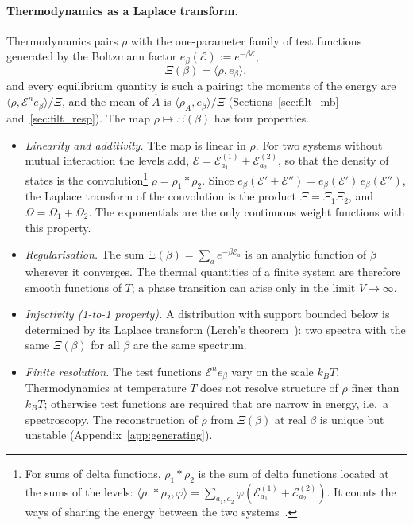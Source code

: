 \documentclass[10pt,a4paper]{article}
\theoremstyle{plain}
\newcommand{\enrg}{\mathcal{E}}  %
\begin{document}
\paragraph{Thermodynamics as a Laplace transform.} Thermodynamics pairs
$\rho$ with the one-parameter family of test functions generated by the
Boltzmann factor $e_\beta(\enrg):=e^{-\beta\enrg}$,
\begin{equation}\label{eq:filt_map}
  \Xi(\beta)=\langle \rho,e_\beta\rangle ,
\end{equation}
and every equilibrium quantity is such a pairing: the moments of the energy
are $\langle\rho,\enrg^{n}e_\beta\rangle/\Xi$, and the mean of $\hat A$ is
$\langle\rho_A,e_\beta\rangle/\Xi$
(Sections~\ref{sec:filt_mb} and~\ref{sec:filt_resp}). The map
$\rho\mapsto\Xi(\beta)$ has four properties.
\begin{itemize}\setlength{\itemsep}{2pt}
\item \emph{Linearity and additivity.} The map is linear in $\rho$. For two
  systems without mutual interaction the levels add,
  $\enrg=\enrg^{(1)}_{a_1}+\enrg^{(2)}_{a_2}$, so that the density of states is
  the convolution\footnote{For sums of delta functions, $\rho_1*\rho_2$ is the
  sum of delta functions located at the sums of the levels:
  $\langle\rho_1*\rho_2,\varphi\rangle=\sum_{a_1,a_2}\varphi(\enrg^{(1)}_{a_1}+\enrg^{(2)}_{a_2})$.
  It counts the ways of sharing the energy between the two
  systems~\cite{Zemanian}.} $\rho=\rho_1*\rho_2$. Since
  $e_\beta(\enrg'+\enrg'')=e_\beta(\enrg')\,e_\beta(\enrg'')$, the Laplace
  transform of the convolution is the product $\Xi=\Xi_1\Xi_2$, and
  $\Omega=\Omega_1+\Omega_2$. The exponentials are the only continuous weight
  functions with this property.
\item \emph{Regularisation.} The sum $\Xi(\beta)=\sum_ae^{-\beta\enrg_a}$ is an
  analytic function of $\beta$ wherever it converges. The thermal quantities
  of a finite system are therefore smooth functions of $T$; a phase
  transition can arise only in the limit $V\to\infty$.
\item \emph{Injectivity (1-to-1 property).} A distribution with support bounded below is
  determined by its Laplace transform (Lerch's theorem~\cite{Widder}): two
  spectra with the same $\Xi(\beta)$ for all $\beta$ are the same spectrum.
\item \emph{Finite resolution.} The test functions $\enrg^{n}e_\beta$ vary on
  the scale $k_BT$. Thermodynamics at temperature $T$ does not resolve
  structure of $\rho$ finer than $k_BT$; otherwise test functions are required that
  are narrow in energy, i.e.\ a spectroscopy. The reconstruction of $\rho$
  from $\Xi(\beta)$ at real $\beta$ is unique but unstable
  (Appendix~\ref{app:generating}).
\end{itemize}
\end{document}

